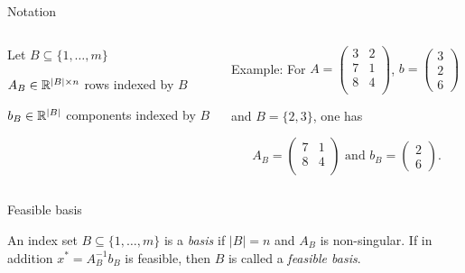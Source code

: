 \begin{frame}{Notation}


  \begin{columns}
    \begin{column}{.5\textwidth}
      Let $B \subseteq \{1,\dots,m\}$

      \bigskip 
      $A_B \in \mathbb{R}^{|B| \times n}$ rows  indexed by   $B$
      

      \bigskip 
      $b_B \in \mathbb{R}^{|B|}$  components  indexed by $B$ 
    \end{column}
    \begin{column}{.5\textwidth}
Example: For       $    A = 
    \begin{pmatrix}
      3 & 2  \\
      7 & 1\\
      8 & 4\\
    \end{pmatrix}$,  $b = 
    \begin{pmatrix}
      3 \\ 2\\ 6
    \end{pmatrix}$

    \medskip 
    and  $B = \{2,3\}$, one has

    \bigskip 
    \begin{displaymath}
    A_B =  \begin{pmatrix}
          7 & 1\\
      8 & 4\\
    \end{pmatrix} \text{ and }  b_B = 
    \begin{pmatrix}
      2\\ 6
    \end{pmatrix}.          
    \end{displaymath}

    \end{column}       
  \end{columns}
\end{frame}

 



\begin{frame}{Feasible basis}
  \begin{definition}
     An index set $B \subseteq \{1,\dots,m\}$ is a \emph{basis} if
      $|B| = n$ and $A_B$ is non-singular. If in addition $x^* =
      A_B^{-1} b_B$ is feasible, then $B$ is called a \emph{feasible
        basis}.
  \end{definition}
  \begin{columns}
    \begin{column}{.5\textwidth}
      
    \end{column}
    \begin{column}{.5\textwidth}
      
    \end{column}       
  \end{columns}
\end{frame}




